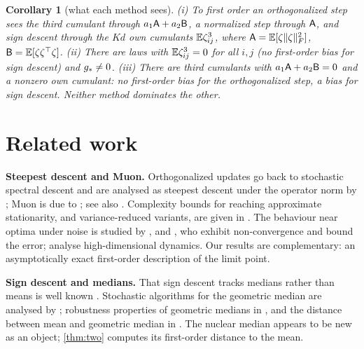 \documentclass{article}
\theoremstyle{plain}
\newtheorem{corollary}[theorem]{Corollary}
\theoremstyle{definition}
\theoremstyle{remark}
\begin{document}
\begin{corollary}[what each method sees]\label{cor:compare}
\textup{(i)} To first order an orthogonalized step sees the third cumulant through $a_1\mathsf{A}+a_2\mathsf{B}$, a normalized step
through $\mathsf{A}$, and sign descent through the $Kd$ own cumulants $\mathbb{E}\zeta_{ij}^3$, where
$\mathsf{A}=\mathbb{E}[\zeta\|\zeta\|_{F}^2]$, $\mathsf{B}=\mathbb{E}[\zeta\zeta^\top\zeta]$. \textup{(ii)} There are laws with $\mathbb{E}\zeta_{ij}^3=0$ for all
$i,j$ (no first-order bias for sign descent) and $g_\ast\ne0$. \textup{(iii)} There are third cumulants with
$a_1\mathsf{A}+a_2\mathsf{B}=0$ and a nonzero own cumulant: no first-order bias for the orthogonalized step, a bias for sign descent.
Neither method dominates the other.
\end{corollary}


\section{Related work}\label{sec:related}

\textbf{Steepest descent and Muon.} Orthogonalized updates go back to stochastic spectral descent
\citep{carlson2015stochastic} and are analysed as steepest descent under the operator norm by \citet{bernstein2024old};
Muon is due to \citet{jordan2024muon}; see also \citet{lau2025polargrad,shulgin2026quadratic}. Complexity bounds for reaching approximate stationarity, and variance-reduced variants, are given in
\citet{huang2026muon,liu2025marsm}. The behaviour near optima under noise is
studied by \citet{xie2026muon}, \citet{chen2026when} and \citet{do2026muon}, who exhibit non-convergence and bound the
error; \citet{paquette2026phases} analyse high-dimensional dynamics. Our results are complementary: an asymptotically
exact first-order description of the limit point.

\textbf{Sign descent and medians.} That sign descent tracks medians rather than means is well known
\citep{bernstein2019majority,chen2020distributed,safaryan2021stochastic,balles2020geometry,karimireddy2019error}. Stochastic
algorithms for the geometric median are analysed by \citet{cardot2013efficient}; robustness properties of geometric
medians in \citet{minsker2015geometric,minskerstrawn}, and the distance between mean and geometric median in
\citet{schwank}. The nuclear median appears to be new as an object; \cref{thm:two} computes its first-order
distance to the mean.
\end{document}
